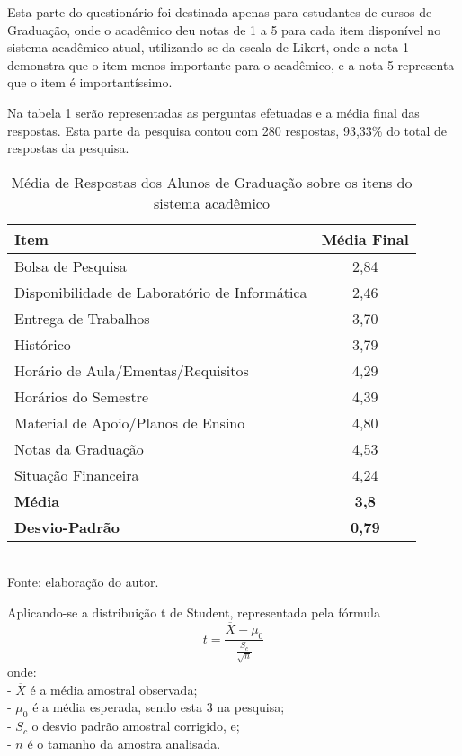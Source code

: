 Esta parte do questionário foi destinada apenas para estudantes de cursos de Graduação, onde o acadêmico deu notas de 1 a 5 para cada item disponível no sistema acadêmico atual, utilizando-se da escala de Likert, onde  a nota 1 demonstra que o item menos importante para o acadêmico, e a nota 5 representa que o item é importantíssimo.

Na tabela 1 serão representadas as perguntas efetuadas e a média final das respostas. Esta parte da pesquisa contou com 280 respostas, 93,33\% do total de respostas da pesquisa.
\begin{table}[!hbt]
\centering
\caption[Média de Respostas dos Alunos de Graduação]{Média de Respostas dos Alunos de Graduação sobre os itens do sistema acadêmico}
\vspace{3mm}
\begin{tabular}{p{9.5cm}|c}\hline
\textbf{Item} & \textbf{Média Final} \\ \hline
Bolsa de Pesquisa & 2,84 \\ \hline
Disponibilidade de Laboratório de Informática & 2,46 \\ \hline
Entrega de Trabalhos & 3,70 \\ \hline
Histórico & 3,79 \\ \hline
Horário de Aula/Ementas/Requisitos & 4,29 \\ \hline
Horários do Semestre & 4,39 \\ \hline
Material de Apoio/Planos de Ensino & 4,80 \\ \hline
Notas da Graduação & 4,53 \\ \hline
Situação Financeira & 4,24 \\ \hline
\textbf{Média} & \textbf{3,8} \\ \hline
\textbf{Desvio-Padrão} & \textbf{0,79} \\ \hline
\end{tabular}
\\ Fonte: elaboração do autor.
\end{table}

Aplicando-se a distribuição t de Student, representada pela fórmula 
\[
t=\frac{{\overline{X}} - \mu_0}
{\frac{S_c}{\sqrt{n}}}
\]
onde:\\ 
- $\overline{X}$ é a média amostral observada; \\
- $\mu_0$ é a média esperada, sendo esta 3 na pesquisa; \\
- $S_c$ o desvio padrão amostral corrigido, e; \\
- $n$ é o tamanho da amostra analisada.

